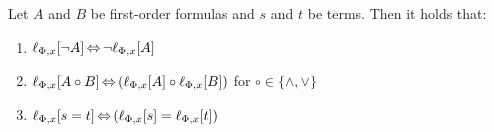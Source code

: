 \documentclass[,%
	paper=a4,%
	DIV14, 
	liststotoc,
	bibtotoc,
	draft=false,%
	numbers=noendperiod
]{scrartcl}
\newcommand{\lif}[1]{\lift{\Delta}{#1}{x}}
\begin{document}
\begin{comment}
	\begin{lemma}
	\label{lemma:lif_literal}
	If $l\sigma$ = $l'\sigma$, then $\lif{l}\sigma' = \lif{l'}\sigma'$ for $\sigma'$ defined as in lemma \ref{lemma:lif}
\end{lemma}
\begin{proof}
	$l\sigma$ = $l'\sigma$

	$\ra \lif{l\sigma} = \lif{l'\sigma}$

	by lemma \ref{lemma:lif}, 
	$\lif{l}\sigma' = \lif{l'}\sigma'$

\end{proof}



\begin{lemma} // currently unused

	$(\lif{C}(x_1, \ldots, x_n))\sigma =
	(\lif{C\sigma'}(x_1, \ldots, x_n))$ if $\sigma$ does not change any of $x_1, \ldots, x_n$ or any of $t_1, \ldots, t_n$.\qedhere

	\todo[inline]{it would work to fix substitutions of $x_i$ by substituting $t_i$ for that instead, as long as the result isn't another $t_i$, but this isn't actually relevant here.}

\end{lemma}

\begin{prop}
	$\Gamma = \lif{\Gamma}$.
\end{prop}
\begin{proof}
	By definition, $\Delta$-terms only appear in $\Delta$ and not in $\Gamma$. 
\end{proof}

\end{comment}

 
\begin{lemma}
  \label{lemma:lift_commute}
  Let $A$ and $B$ be first-order formulas and $s$ and $t$ be terms. Then it holds that:
  \begin{enumerate}
    \item $\lift{\Phi}{\lnot A}{x} \semiff{} \lnot \lift{\Phi}{A}{x}$
    \item $\lift{\Phi}{A \circ B}{x} \semiff{} ( \lift{\Phi}{A}{x} \circ \lift{\Phi}{B}{x} )$ for  $\circ \in \{\land, \lor\}$
    \item $\lift{\Phi}{s = t}{x} \semiff{} ( \lift{\Phi}{s}{x} = \lift{\Phi}{t}{x} )$
  \end{enumerate}
\end{lemma}
\end{document}
